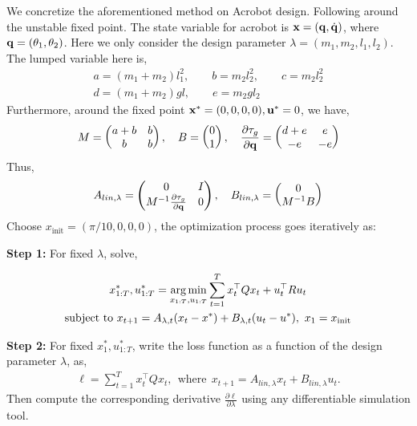 \documentclass{article}
\begin{document}
We concretize the aforementioned method on Acrobot design. Following \cite{murray1991case} around the unstable fixed point. The state variable for acrobot is $\mathbf{x} = (\mathbf{q},\dot{\mathbf{q}})$, where $\mathbf{q} = (\theta_1,\theta_2)$. Here we only consider the design parameter $\lambda = (m_1,m_2,l_1,l_2)$. The lumped variable here is,
\begin{gather*}
a =  (m_1+m_2)l_1^2,\qquad b=m_2l_2^2,\qquad c=m_2l_2^2\\
d = (m_1+m_2)gl,\qquad  e=m_2gl_2  
\end{gather*}
Furthermore, around the fixed point $\mathbf{x}^* = (0,0,0,0), \mathbf{u}^* = 0$, we have,
\begin{align*}
M = 
\begin{pmatrix}
a+b&b\\
b&b
\end{pmatrix},\quad
B = 
\begin{pmatrix}
0\\
1
\end{pmatrix},\quad
\frac{\partial \tau_g}{\partial \mathbf{q}} =
\begin{pmatrix}
d+e&e\\
-e&-e
\end{pmatrix}
\end{align*}
Thus,
\begin{align*}
A_{lin,\lambda} = 
\begin{pmatrix}
0 & I\\
M^{-1} \frac{\partial \tau_g}{\partial \mathbf{q}} & 0
\end{pmatrix},\quad
B_{lin,\lambda} =
\begin{pmatrix}
0 \\
M^{-1}B
\end{pmatrix}
\end{align*}
Choose $x_{\text{init}} = (\pi/10,0,0,0)$, the optimization process goes iteratively as:


\textbf{Step 1:}
For fixed $\lambda$, solve,

\begin{gather*}
    x_{1:T}^*, u_{1:T}^*= \operatorname*{arg\,min}\limits_{x_{1:T},u_{1:T}} \sum\limits_{t=1}^{T} x_t^\top Q x_t + u_t^\top R u_t \\
    \text{subject to~} x_{t+1} = A_{\lambda,t}(x_t - x^*) + B_{\lambda,t}(u_t-u^*) ,~x_1 = x_{\text{init}}
\end{gather*}

\textbf{Step 2:}
For fixed $x_1^*, u_{1:T}^*$, write the loss function as a function of the design parameter $\lambda$, as,
\begin{align*}
\ell = \sum\limits_{t=1}^{T} x_t^\top Q x_t,~~\text{where}~~ x_{t+1} = A_{lin,\lambda}x_t + B_{lin,\lambda}u_t.
\end{align*}
Then compute the corresponding derivative $\frac{\partial \ell}{\partial \lambda}$ using any differentiable simulation tool.
\end{document}
